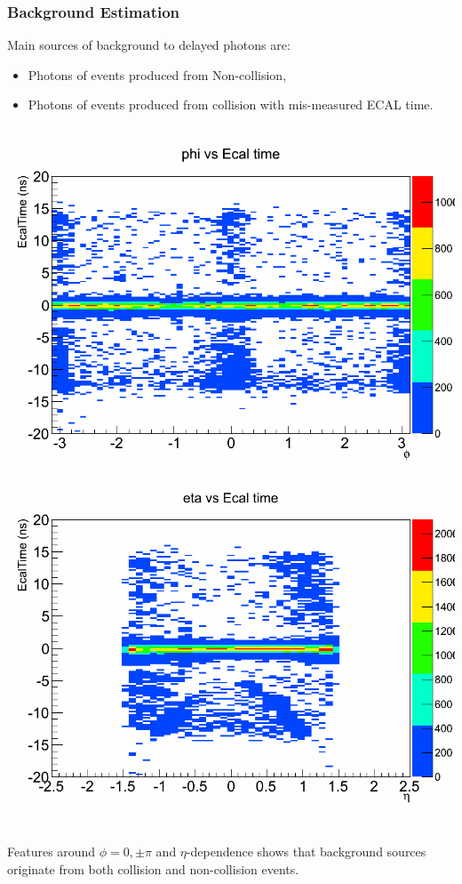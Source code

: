 \documentclass{beamer}
\begin{document}
\begin{frame}
\frametitle{\Huge Background Estimation}
  \begin{minipage}[t]{\linewidth}
   Main sources of background to delayed photons are:   
   \begin{itemize}
    \item Photons of events produced from Non-collision,
    \item Photons of events produced from collision with mis-measured ECAL time.
   \end{itemize}
  \end{minipage}
  
  \begin{minipage}[t]{\linewidth}
    \mbox{
 \includegraphics[width=0.40\paperwidth]{THESISPLOTS/h_Phi_Time.png}
 \includegraphics[width=0.40\paperwidth]{THESISPLOTS/h_Eta_Time.png} }
   \end{minipage}
\begin{minipage}[b]{\linewidth}
Features around $\phi = 0, \pm \pi$ and $\eta$-dependence shows that background sources originate from both collision and non-collision events.
\end{minipage} 
\end{frame}
\end{document}

